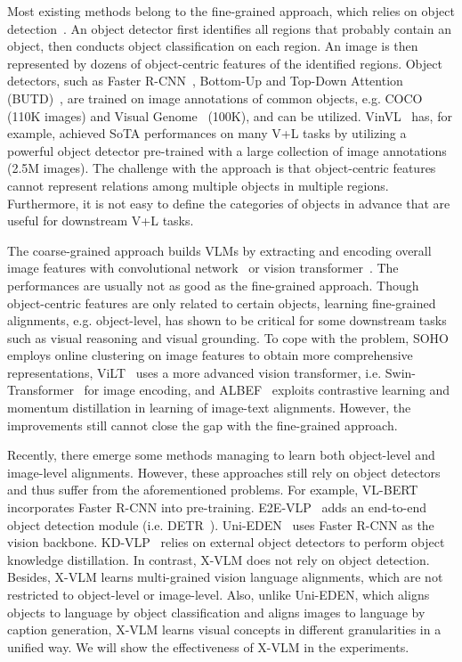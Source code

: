 \documentclass[nohyperref]{article}
\theoremstyle{plain}
\theoremstyle{definition}
\theoremstyle{remark}
\begin{document}
Most existing methods belong to the fine-grained approach, which relies on object detection~\cite{tan2019lxmert, lu2019vilbert, li2019visualbert, li2020unicoder, chen2020uniter, li2020oscar, gan2020large, li2020unimo}. An object detector first identifies all regions that probably contain an object, then conducts object classification on each region. An image is then represented by dozens of object-centric features of the identified regions. Object detectors, such as Faster R-CNN~\cite{ren2015faster}, Bottom-Up and Top-Down Attention (BUTD)~\cite{anderson2018bottom}, are trained on image annotations of common objects, e.g. COCO~\cite{lin2014microsoft} (110K images) and Visual Genome~\cite{krishna2016visual} (100K), and can be utilized. VinVL~\cite{zhang2021vinvl} has, for example, achieved SoTA performances on many V+L tasks by utilizing a powerful object detector pre-trained with a large collection of image annotations (2.5M images). The challenge with the approach is that object-centric features cannot represent relations among multiple objects in multiple regions. Furthermore, it is not easy to define the categories of objects in advance that are useful for downstream V+L tasks. 


The coarse-grained approach builds VLMs by extracting and encoding overall image features with convolutional network~\cite{jiang2020defense, huang2020pixel, huang2021seeing} or vision transformer~\cite{kim2021vilt, li2021align}. The performances are usually not as good as the fine-grained approach. Though object-centric features are only related to certain objects, learning fine-grained alignments, e.g. object-level, has shown to be critical for some downstream tasks such as visual reasoning and visual grounding. To cope with the problem, SOHO~\cite{huang2021seeing} employs online clustering on image features to obtain more comprehensive representations, ViLT~\cite{kim2021vilt} uses a more advanced vision transformer, i.e. Swin-Transformer~\cite{liu2021swin} for image encoding, and ALBEF~\cite{li2021align} exploits contrastive learning and momentum distillation in learning of image-text alignments. However, the improvements still cannot close the gap with the fine-grained approach. 


Recently, there emerge some methods managing to learn both object-level and image-level alignments. However, these approaches still rely on object detectors and thus suffer from the aforementioned problems. For example, VL-BERT~\cite{su2019vl} incorporates Faster R-CNN into pre-training. E2E-VLP~\cite{xu2021e2e} adds an end-to-end object detection module (i.e. DETR~\cite{carion2020end}). Uni-EDEN~\cite{li2022uni} uses Faster R-CNN as the vision backbone. KD-VLP~\cite{liu2021kd} relies on external object detectors to perform object knowledge distillation. In contrast, X-VLM does not rely on object detection. Besides, X-VLM learns multi-grained vision language alignments, which are not restricted to object-level or image-level. Also, unlike Uni-EDEN, which aligns objects to language by object classification and aligns images to language by caption generation, X-VLM learns visual concepts in different granularities in a unified way. We will show the effectiveness of X-VLM in the experiments. 
\end{document}
